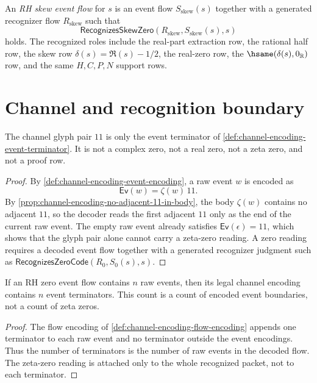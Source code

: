 \begin{definition}
\label{def:rh-skew-event-flow}
An \emph{RH skew event flow} for $s$ is an event flow $S_{\mathrm{skew}}(s)$
together with a generated recognizer flow $R_{\mathrm{skew}}$ such that
$$
\mathsf{RecognizesSkewZero}(R_{\mathrm{skew}},S_{\mathrm{skew}}(s),s)
$$
holds.  The recognized roles include the real-part extraction row, the rational
half row, the skew row $\delta(s)=\Re(s)-1/2$, the real-zero row, the
$\hsame(\delta(s),0_{\mathbb R})$ row, and the same $H,C,P,N$ support rows.
\end{definition}

\section{Channel and recognition boundary}
\label{sec:rh-channel-recognition-boundary}

\begin{proposition}
\label{prop:rh-terminator-not-zero-record}
The channel glyph pair $11$ is only the event terminator of
\autoref{def:channel-encoding-event-terminator}.  It is not a complex zero,
not a real zero, not a zeta zero, and not a proof row.
\end{proposition}

\begin{proof}
By \autoref{def:channel-encoding-event-encoding}, a raw event $w$ is encoded
as
$$
\mathsf{Ev}(w)=\zeta(w)\,11.
$$
By \autoref{prop:channel-encoding-no-adjacent-11-in-body}, the body
$\zeta(w)$ contains no adjacent $11$, so the decoder reads the first adjacent
$11$ only as the end of the current raw event.  The empty raw event already
satisfies $\mathsf{Ev}(\epsilon)=11$, which shows that the glyph pair alone
cannot carry a zeta-zero reading.  A zero reading requires a decoded event
flow together with a generated recognizer judgment such as
$\mathsf{RecognizesZeroCode}(R_0,S_0(s),s)$.
\end{proof}

\begin{corollary}
\label{cor:rh-terminator-count-event-count}
If an RH zero event flow contains $n$ raw events, then its legal channel
encoding contains $n$ event terminators.  This count is a count of encoded
event boundaries, not a count of zeta zeros.
\end{corollary}

\begin{proof}
The flow encoding of \autoref{def:channel-encoding-flow-encoding} appends one
terminator to each raw event and no terminator outside the event encodings.
Thus the number of terminators is the number of raw events in the decoded
flow.  The zeta-zero reading is attached only to the whole recognized packet,
not to each terminator.
\end{proof}

